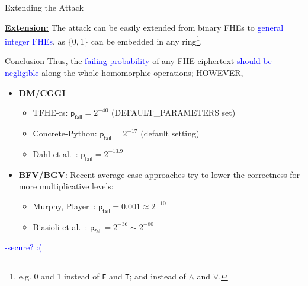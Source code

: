 \documentclass[handout]{beamer}
\begin{document}
	\begin{frame}{Extending the \indcpad Attack}
 
    {
    \underline{\bf Extension:} The attack can be easily extended from binary FHEs to \textcolor{blue}{general integer FHEs}, as $\{0, 1\}$ can be embedded in any ring\footnote{e.g. 0 and 1 instead of \texttt{F} and \texttt{T}; \mult and \add instead of $\wedge$ and $\vee$.}.
    }
	\end{frame}

	\begin{frame}{Conclusion}
    Thus, the \textcolor{blue}{failing probability} of any FHE ciphertext \textcolor{blue}{should be negligible} along the whole homomorphic operations; HOWEVER,\vspace{0.3cm}\pause
    
    \begin{itemize}
        \item {\bf DM/CGGI}
            \begin{itemize}
                \item {TFHE-rs}: $\mathsf{p}_\mathsf{fail} =2^{-40}$ (DEFAULT\_PARAMETERS set)
                \item {{Concrete-Python}}: $\mathsf{p}_\mathsf{fail} =2^{-17}$ (default setting)
                \item {Dahl et al.~\cite{cryptoeprint:2023/815}}: $\mathsf{p}_\mathsf{fail} =2^{-13.9}$
            \end{itemize}\vspace{0.3cm}\pause
        \item {\bf BFV/BGV}: Recent average-case approaches try to lower the correctness for more multiplicative levels:
            \begin{itemize}
                \item {Murphy, Player~\cite{EPRINT:MurPla19a}}: $\mathsf{p}_\mathsf{fail} =0.001 \approx 2^{-10}$
                \item {Biasioli et al.~\cite{cryptoeprint:2023/600}}: $\mathsf{p}_\mathsf{fail} =2^{-36} \sim 2^{-80}$
            \end{itemize}
    \end{itemize}\vspace{0.3cm}\pause
    \begin{center}
        \textcolor{blue}{\indcpad-secure? :(}
    \end{center}
	\end{frame}
\end{document}
